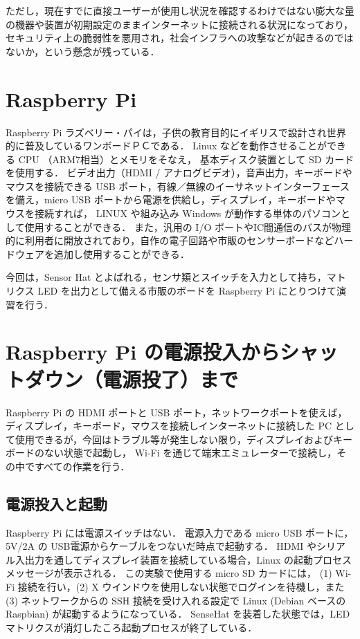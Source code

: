 \documentclass[11pt,a4,epsf]{article}
\begin{document}
ただし，現在すでに直接ユーザーが使用し状況を確認するわけではない膨大な量の機器や装置が初期設定のままインターネットに接続される状況になっており，
セキュリティ上の脆弱性を悪用され，社会インフラへの攻撃などが起きるのではないか，という懸念が残っている．

\section{Raspberry Pi}

Raspberry Pi ラズベリー・パイは，子供の教育目的にイギリスで設計され世界的に普及しているワンボードＰＣである．
Linux などを動作させることができる CPU （ARM7相当）とメモリをそなえ， 基本ディスク装置として SD カードを使用する．
ビデオ出力（HDMI / アナログビデオ），音声出力，キーボードやマウスを接続できる USB ポート，有線／無線のイーサネットインターフェースを備え，micro USB ポートから電源を供給し，ディスプレイ，キーボードやマウスを接続すれば，
LINUX や組み込み Windows が動作する単体のパソコンとして使用することができる．
また，汎用の I/O ポートやIC間通信のバスが物理的に利用者に開放されており，自作の電子回路や市販のセンサーボードなどハードウェアを追加し使用することができる．

今回は，Sensor Hat  とよばれる，センサ類とスイッチを入力として持ち，マトリクス LED を出力として備える市販のボードを Raspberry Pi にとりつけて演習を行う．


\section{Raspberry Pi の電源投入からシャットダウン（電源投了）まで}

Raspberry Pi の HDMI ポートと USB ポート，ネットワークポートを使えば，ディスプレイ，キーボード，マウスを接続しインターネットに接続した PC として使用できるが，今回はトラブル等が発生しない限り，ディスプレイおよびキーボードのない状態で起動し，
Wi-Fi を通じて端末エミュレーターで接続し，その中ですべての作業を行う．

\subsection{電源投入と起動}

Raspberry Pi には電源スイッチはない．
電源入力である micro USB ポートに，5V/2A の USB電源からケーブルをつないだ時点で起動する．
HDMI やシリアル入出力を通してディスプレイ装置を接続している場合，Linux の起動プロセスメッセージが表示される．
この実験で使用する micro SD カードには， (1)  Wi-Fi 接続を行い，(2) X ウインドウを使用しない状態でログインを待機し，また (3) ネットワークからの SSH 接続を受け入れる設定で Linux (Debian ベースの Raspbian) が起動するようになっている．
SenseHat を装着した状態では，LED マトリクスが消灯したころ起動プロセスが終了している．
\end{document}
